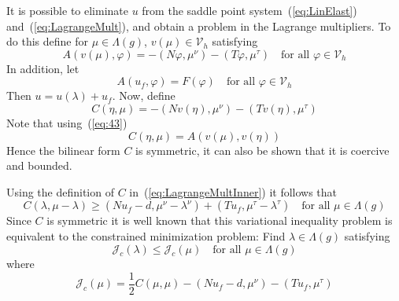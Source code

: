 \documentclass[12pt,a4paper]{article}
\numberwithin{equation}{section}
\numberwithin{table}{section}
\numberwithin{figure}{section}
\newcommand{\J}{\ensuremath{\mathcal{J}}}
\newcommand{\half}{\ensuremath{\frac{1}{2}}}
\newcommand{\Vh}{{\mathcal V}_h}
\renewcommand{\phi}{\varphi}
\newcommand{\qforall}{\quad\text{for all }}
\begin{document}
It is possible to eliminate $u$ from the saddle point system~(\ref{eq:LinElast})
and~(\ref{eq:LagrangeMult}), and obtain a problem in the Lagrange multipliers.  To do this
define for $\mu\in\Lambda(g)$, $v(\mu)\in\Vh$ satisfying
\begin{equation}
  \label{eq:43}
  A(v(\mu), \phi) = -(N\phi, \mu^\nu) - (T\phi, \mu^\tau)
  \qforall \phi\in\Vh
\end{equation}
In addition, let
\begin{equation}
  \label{eq:42}
  A(u_f, \phi) = F(\phi)\qforall \phi\in\Vh
\end{equation}
Then $u=u(\lambda)+u_f$.  Now, define
\begin{equation}
  \label{eq:45}
  C(\eta, \mu) = -(Nv(\eta), \mu^\nu) - (Tv(\eta), \mu^\tau)
\end{equation}
Note that using~(\ref{eq:43})
\begin{equation}
  \label{eq:47}
  C(\eta, \mu) = A(v(\mu), v(\eta))
\end{equation}
Hence the bilinear form $C$ is symmetric, it can also be shown that it is coercive and
bounded.

Using the definition of $C$ in~(\ref{eq:LagrangeMultInner}) it follows that
\begin{equation}
  \label{eq:48}
    C(\lambda, \mu-\lambda) \ge (N u_f-d, \mu^\nu-\lambda^\nu)
    + (T u_f, \mu^\tau-\lambda^\tau)
  \qforall \mu \in \Lambda(g)
\end{equation}
Since $C$ is symmetric it is well known that this variational inequality problem is
equivalent to the constrained minimization problem: Find $\lambda\in\Lambda(g)$ satisfying
\begin{equation}
  \label{eq:49}
  \J_c (\lambda) \le \J_c(\mu)\qforall \mu\in\Lambda(g)
\end{equation}
where
\begin{equation}
  \label{eq:50}
  \J_c(\mu) = \half C(\mu,\mu) - (N u_f-d, \mu^\nu) - (T u_f, \mu^\tau)
\end{equation}
\end{document}
